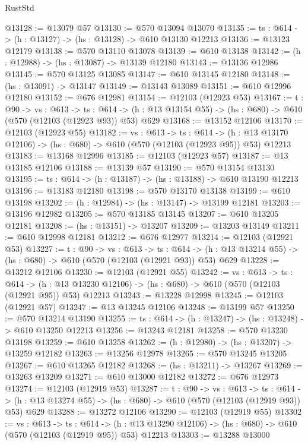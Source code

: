\begin{lexlean}{RustStd}
\begin{coremodule}
@13128 := @13079 @57
@13130 := @570 @13094 @13070
@13135 := {ts : @614} -> (h : @13127) -> (hs : @13128) -> @610 @13130 @12213
@13136 := @13123 @12179
@13138 := @570 @13110 @13078
@13139 := @610 @13138
@13142 := (h : @12988) -> (hs : @13087) -> @13139 @12180
@13143 := @13136 @12986
@13145 := @570 @13125 @13085
@13147 := @610 @13145 @12180
@13148 := (hs : @13091) -> @13147
@13149 := @13143 @13089
@13151 := @610 @12996 @12180
@13152 := @676 @12981
@13154 := @12103 (@12923 @53)
@13167 := {t : @90} ->
  {vs : @613} ->
  {ts : @614} -> (h : @13 @13154 @55) -> (hs : @680) -> @610 (@570 (@12103 (@12923 @93)) @53) @629
@13168 := @13152 @12106
@13170 := @12103 (@12923 @55)
@13182 := {vs : @613} ->
  {ts : @614} ->
  (h : @13 @13170 @12106) -> (hs : @680) -> @610 (@570 (@12103 (@12923 @95)) @53) @12213
@13183 := @13168 @12996
@13185 := @12103 (@12923 @57)
@13187 := @13 @13185 @12106
@13188 := @13139 @57
@13190 := @570 @13154 @13130
@13195 := {ts : @614} -> (h : @13187) -> (hs : @13188) -> @610 @13190 @12213
@13196 := @13183 @12180
@13198 := @570 @13170 @13138
@13199 := @610 @13198
@13202 := (h : @12984) -> (hs : @13147) -> @13199 @12181
@13203 := @13196 @12982
@13205 := @570 @13185 @13145
@13207 := @610 @13205 @12181
@13208 := (hs : @13151) -> @13207
@13209 := @13203 @13149
@13211 := @610 @12998 @12181
@13212 := @676 @12977
@13214 := @12103 (@12921 @53)
@13227 := {t : @90} ->
  {vs : @613} ->
  {ts : @614} -> (h : @13 @13214 @55) -> (hs : @680) -> @610 (@570 (@12103 (@12921 @93)) @53) @629
@13228 := @13212 @12106
@13230 := @12103 (@12921 @55)
@13242 := {vs : @613} ->
  {ts : @614} ->
  (h : @13 @13230 @12106) -> (hs : @680) -> @610 (@570 (@12103 (@12921 @95)) @53) @12213
@13243 := @13228 @12998
@13245 := @12103 (@12921 @57)
@13247 := @13 @13245 @12106
@13248 := @13199 @57
@13250 := @570 @13214 @13190
@13255 := {ts : @614} -> (h : @13247) -> (hs : @13248) -> @610 @13250 @12213
@13256 := @13243 @12181
@13258 := @570 @13230 @13198
@13259 := @610 @13258
@13262 := (h : @12980) -> (hs : @13207) -> @13259 @12182
@13263 := @13256 @12978
@13265 := @570 @13245 @13205
@13267 := @610 @13265 @12182
@13268 := (hs : @13211) -> @13267
@13269 := @13263 @13209
@13271 := @610 @13000 @12182
@13272 := @676 @12973
@13274 := @12103 (@12919 @53)
@13287 := {t : @90} ->
  {vs : @613} ->
  {ts : @614} -> (h : @13 @13274 @55) -> (hs : @680) -> @610 (@570 (@12103 (@12919 @93)) @53) @629
@13288 := @13272 @12106
@13290 := @12103 (@12919 @55)
@13302 := {vs : @613} ->
  {ts : @614} ->
  (h : @13 @13290 @12106) -> (hs : @680) -> @610 (@570 (@12103 (@12919 @95)) @53) @12213
@13303 := @13288 @13000

\end{coremodule}
\end{lexlean}
